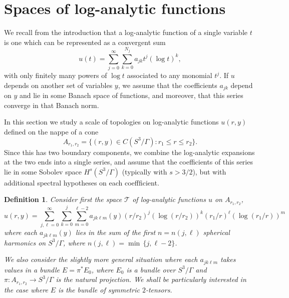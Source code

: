 \documentclass[12pt]{article}
\newtheorem{defn}[thm]{Definition}
\newcommand{\calT}{{\mathcal T}}
\begin{document}
\section{Spaces of log-analytic functions}
We recall from the introduction that a log-analytic function of a single variable $t$ is one which
can be represented as a convergent sum
\[
u(t) = \sum_{j=0}^\infty \sum_{k=0}^{N_j} a_{jk} t^j (\log t)^k,
\]
with only finitely many powers of $\log t$ associated to any monomial $t^j$.  If $u$ depends on another set of variables $y$, 
we assume that the coefficients $a_{jk}$ depend on $y$ and lie in some Banach space of functions, and moreover, that
this series converge in that Banach norm. 

In this section we study a scale of topologies on log-analytic functions $u(r,y)$ defined on the nappe of a cone
\[
A_{r_1, r_2} = \{ (r,y) \in C(S^3/\Gamma):  r_1 \leq r \leq r_2 \}.
\]
Since this has two boundary components, we combine the log-analytic expansions at the two ends into
a single series, and assume that the coefficients of this series lie in some Sobolev space $H^s( S^3/\Gamma)$
(typically with $s > 3/2$), but with additional spectral hypotheses on each coeffficient. 
\begin{defn}
Consider first the space $\calT$ of log-analytic functions $u$ on $A_{r_1, r_2}$,
\[
u(r,y) = \sum_{j, \ell = 0}^\infty \sum_{k = 0}^{j} \sum_{m=0}^{\ell-2}  a_{j k \ell m}(y) 
(r/r_2)^j ( \log (r/r_2))^k (r_1/r)^\ell (\log (r_1/r))^m
\]
where each $a_{jk \ell m}(y)$ lies in the sum of the first $n = n(j,\ell)$ spherical harmonics on $S^3/\Gamma$, where $n(j,\ell) 
= \min \, \{ j, \ell-2\}$.  

We also consider the slightly more general situation where each $a_{j k \ell m}$ takes values in a bundle $E = \pi^* E_0$, where
$E_0$ is a bundle over $S^3/\Gamma$ and $\pi: A_{r_1, r_2} \to S^3/\Gamma$ is the natural projection. We shall
be particularly interested in the case where $E$ is the bundle of symmetric $2$-tensors. 
\end{defn}
\end{document}
